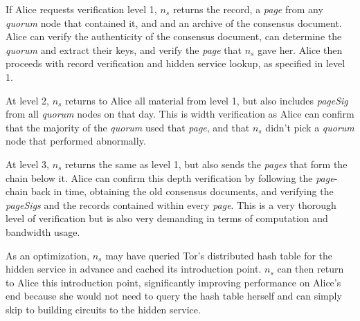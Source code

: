 If Alice requests verification level 1, $ n_{s} $ returns the record, a \emph{page} from any \emph{quorum} node that contained it, and and an archive of the consensus document. Alice can verify the authenticity of the consensus document, can determine the \emph{quorum} and extract their keys, and verify the \emph{page} that $ n_{s} $ gave her. Alice then proceeds with record verification and hidden service lookup, as specified in level 1.

At level 2, $ n_{s} $ returns to Alice all material from level 1, but also includes \emph{pageSig} from all \emph{quorum} nodes on that day. This is width verification as Alice can confirm that the majority of the \emph{quorum} used that \emph{page}, and that $ n_{s} $ didn't pick a \emph{quorum} node that performed abnormally.

At level 3, $ n_{s} $ returns the same as level 1, but also sends the \emph{pages} that form the chain below it. Alice can confirm this depth verification by following the \emph{page}-chain back in time, obtaining the old consensus documents, and verifying the \emph{pageSigs} and the records contained within every \emph{page}. This is a very thorough level of verification but is also very demanding in terms of computation and bandwidth usage.

As an optimization, $ n_{s} $ may have queried Tor's distributed hash table for the hidden service in advance and cached its introduction point. $ n_{s} $ can then return to Alice this introduction point, significantly improving performance on Alice's end because she would not need to query the hash table herself and can simply skip to building circuits to the hidden service.


